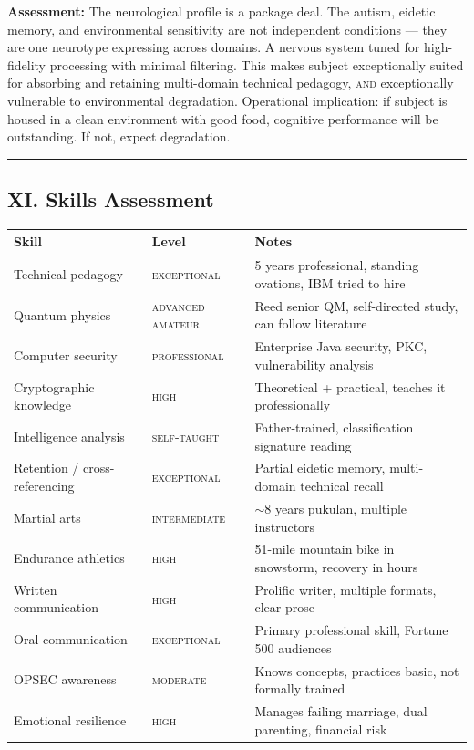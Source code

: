 \textbf{Assessment:} The neurological profile is a package deal. The autism, eidetic memory, and environmental sensitivity are not independent conditions --- they are one neurotype expressing across domains. A nervous system tuned for high-fidelity processing with minimal filtering. This makes subject exceptionally suited for absorbing and retaining multi-domain technical pedagogy, \textsc{and} exceptionally vulnerable to environmental degradation. Operational implication: if subject is housed in a clean environment with good food, cognitive performance will be outstanding. If not, expect degradation.

\vspace{1cm}\hrule\vspace{1cm}

\subsection*{XI. Skills Assessment}
\label{interlude:skills-assessment}

{%
\small
\begin{tabular}{p{3.5cm} p{3cm} p{7cm}}
\hline
\textbf{Skill} & \textbf{Level} & \textbf{Notes} \\
\hline
Technical pedagogy & \textsc{exceptional} & 5 years professional, standing ovations, IBM tried to hire \\
Quantum physics & \textsc{advanced amateur} & Reed senior QM, self-directed study, can follow literature \\
Computer security & \textsc{professional} & Enterprise Java security, PKC, vulnerability analysis \\
Cryptographic knowledge & \textsc{high} & Theoretical + practical, teaches it professionally \\
Intelligence analysis & \textsc{self-taught} & Father-trained, classification signature reading \\
Retention / cross-referencing & \textsc{exceptional} & Partial eidetic memory, multi-domain technical recall \\
Martial arts & \textsc{intermediate} & $\sim$8 years pukulan, multiple instructors \\
Endurance athletics & \textsc{high} & 51-mile mountain bike in snowstorm, recovery in hours \\
Written communication & \textsc{high} & Prolific writer, multiple formats, clear prose \\
Oral communication & \textsc{exceptional} & Primary professional skill, Fortune 500 audiences \\
OPSEC awareness & \textsc{moderate} & Knows concepts, practices basic, not formally trained \\
Emotional resilience & \textsc{high} & Manages failing marriage, dual parenting, financial risk \\
\hline
\end{tabular}
}%

